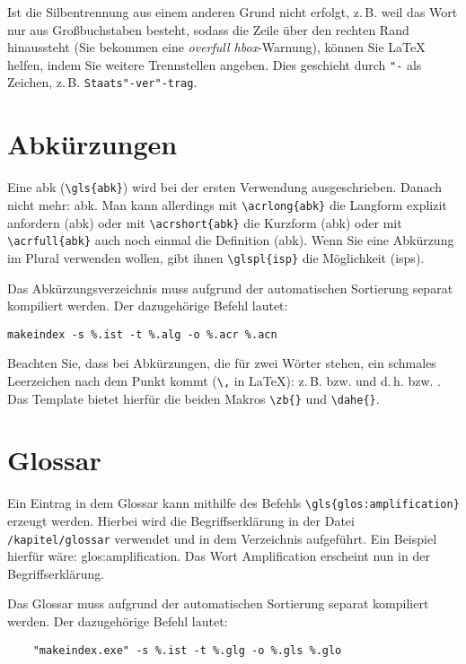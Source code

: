 Ist die Silbentrennung aus einem anderen Grund nicht erfolgt, z.\,B. weil das Wort nur aus Großbuchstaben besteht, sodass die Zeile über den rechten Rand hinaussteht (Sie bekommen eine \textit{overfull hbox}-Warnung), können Sie \LaTeX{} helfen, indem Sie weitere Trennstellen angeben. Dies geschieht durch \verb+"-+ als Zeichen, z.\,B. \verb+Staats"-ver"-trag+.

\section{Abkürzungen}

Eine \gls{abk} (\verb+\gls{abk}+) wird bei der ersten Verwendung ausgeschrieben. Danach nicht mehr: \gls{abk}. Man kann allerdings mit \verb+\acrlong{abk}+ die Langform explizit anfordern (\acrlong{abk}) oder mit \verb+\acrshort{abk}+ die Kurzform (\acrshort{abk}) oder mit \verb+\acrfull{abk}+ auch noch einmal die Definition (\acrfull{abk}). Wenn Sie eine Abkürzung im Plural verwenden wollen, gibt ihnen \verb+\glspl{isp}+ die Möglichkeit (\glspl{isp}).

Das Abkürzungsverzeichnis muss aufgrund der automatischen Sortierung separat kompiliert werden. Der dazugehörige Befehl lautet:
\begin{verbatim}
makeindex -s %.ist -t %.alg -o %.acr %.acn
\end{verbatim}

Beachten Sie, dass bei Abkürzungen, die für zwei Wörter stehen, ein schmales Leerzeichen nach dem Punkt kommt (\verb+\,+ in \LaTeX{}): z.\,B. bzw. \zb{} und d.\,h. bzw. \dahe{}. Das Template bietet hierfür die beiden Makros \verb+\zb{}+ und \verb+\dahe{}+.


\section{Glossar}
Ein Eintrag in dem Glossar kann mithilfe des Befehls \verb*|\gls{glos:amplification}| erzeugt werden. Hierbei wird die Begriffserklärung in der Datei \texttt{/kapitel/glossar} verwendet und in dem Verzeichnis aufgeführt. Ein Beispiel hierfür wäre: \gls{glos:amplification}. Das Wort Amplification erscheint nun in der Begriffserklärung.

Das Glossar muss aufgrund der automatischen Sortierung separat kompiliert werden. Der dazugehörige Befehl lautet:
\begin{verbatim}
	"makeindex.exe" -s %.ist -t %.glg -o %.gls %.glo
\end{verbatim}



